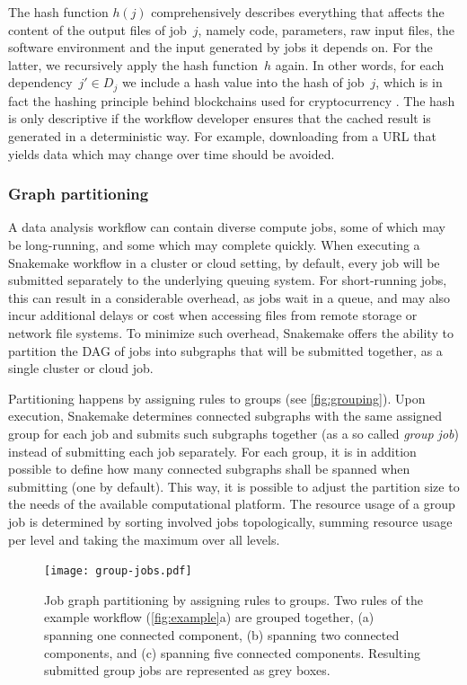 \documentclass[parskip=half, DIV=18]{scrartcl}
\begin{document}
The hash function $h(j)$ comprehensively describes everything that affects the content of the output files of job~\(j\), namely code, parameters, raw input files, the software environment and the input generated by jobs it depends on.
For the latter, we recursively apply the hash function~\(h\) again.
In other words, for each dependency~\(j' \in D_j\) we include a hash value into the hash of job~\(j\), which is in fact the hashing principle behind blockchains used for cryptocurrency \parencite{narayanan_bitcoin_2016}.
The hash is only descriptive if the workflow developer ensures that the cached result is generated in a deterministic way.
For example, downloading from a URL that yields data which may change over time should be avoided.

\subsubsection{Graph partitioning}\label{sec:partitioning}

A data analysis workflow can contain diverse compute jobs, some of which may be long-running, and some which may complete quickly.
When executing a Snakemake workflow in a cluster or cloud setting, by default, every job will be submitted separately to the underlying queuing system.
For short-running jobs, this can result in a considerable overhead, as jobs wait in a queue, and may also incur additional delays or cost when accessing files from remote storage or network file systems.
To minimize such overhead, Snakemake offers the ability to partition the DAG of jobs into subgraphs that will be submitted together, as a single cluster or cloud job.

Partitioning happens by assigning rules to groups (see \autoref{fig:grouping}).
Upon execution, Snakemake determines connected subgraphs with the same assigned group for each job and submits such subgraphs together (as a so called \emph{group job}) instead of submitting each job separately.
For each group, it is in addition possible to define how many connected subgraphs shall be spanned when submitting (one by default).
This way, it is possible to adjust the partition size to the needs of the available computational platform.
The resource usage of a group job is determined by sorting involved jobs topologically, summing resource usage per level and taking the maximum over all levels.

\begin{figure}
    \centering
	\texttt{[image: group-jobs.pdf]}
	\caption{Job graph partitioning by assigning rules to groups.
		Two rules of the example workflow (\autoref{fig:example}a) are grouped together, (a) spanning one connected component, (b) spanning two connected components, and (c) spanning five connected components.
		Resulting submitted group jobs are represented as grey boxes.
	}\label{fig:grouping}
\end{figure}
\end{document}
